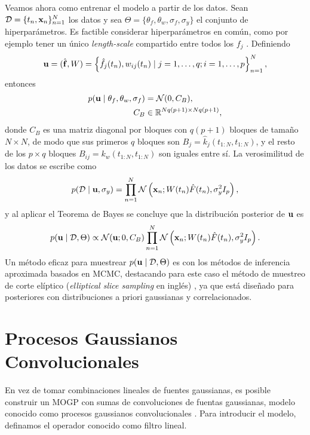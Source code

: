 Veamos ahora como entrenar el modelo a partir de los datos. Sean \(\mathcal{D} = \{t_{n}, \mathbf{x}_{n}\}_{n=1}^{N}\) los datos y sea \(\Theta = \{\theta_{f}, \theta_{w}, \sigma_{f}, \sigma_{y}\}\) el conjunto de hiperparámetros. Es factible considerar hiperparámetros en común, como por ejemplo tener un único \emph{length-scale} compartido entre todos los \(f_{j}\) . Definiendo
\[\mathbf{u} = (\hat{\mathbf{f}}, W) = \left\{\hat{f}_{j}(t_{n}), w_{ij}(t_{n}) \mid j=1, \dotsc, q; i=1, \dotsc, p\right\}_{n=1}^{N},\]
entonces
\begin{align*}
p(\mathbf{u} \mid \theta_{f}, \theta_{w}, \sigma_{f})	&= \mathcal{N}(0, C_B), \\
C_{B}											&\in \mathbb{R}^{N q (p+1) \times N q(p+1)},
\end{align*}
donde \(C_{B}\) es una matriz diagonal por bloques con \(q (p+1)\) bloques de tamaño \(N \times N\), de modo que sus primeros \(q\) bloques son \(B_{j} = \hat{k}_{j}(t_{1:N}, t_{1:N})\), y el resto de los \(p \times q\) bloques \(B_{ij} = k_{w}(t_{1:N}, t_{1:N})\) son iguales entre sí. La verosimilitud de los datos se escribe como
\begin{equation*}
p(\mathcal{D} \mid \mathbf{u}, \sigma_{y}) = \prod_{n=1}^{N} \mathcal{N}\left(\mathbf{x}_{n}; W(t_{n}) \hat{F}(t_{n}), \sigma_{y}^{2} I_{p}\right),
\end{equation*}
y al aplicar el Teorema de Bayes se concluye que la distribución posterior de \(\mathbf{u}\) es
\begin{equation*}
p(\mathbf{u} \mid \mathcal{D}, \Theta) \propto \mathcal{N}(\mathbf{u}; 0, C_{B}) \prod_{n=1}^{N} \mathcal{N}\left(\mathbf{x}_{n}; W(t_{n}) \hat{F}(t_{n}), \sigma_{y}^{2} I_{p}\right).
\end{equation*}
Un método eficaz para muestrear \(p(\mathbf{u} \mid \mathcal{D}, \Theta)\) es con los métodos de inferencia aproximada basados en MCMC, destacando para este caso el método de muestreo de corte elíptico (\emph{elliptical slice sampling} en inglés) \cite{murphybook2012}, ya que está diseñado para posteriores con distribuciones a priori gaussianas y correlacionados.


\section{Procesos Gaussianos Convolucionales}

En vez de tomar combinaciones lineales de fuentes gaussianas, es posible construir un MOGP con sumas de convoluciones de fuentas gaussianas, modelo conocido como procesos gaussianos convolucionales \cite{boyle2004dependent} . Para introducir el modelo, definamos el operador conocido como filtro lineal.


